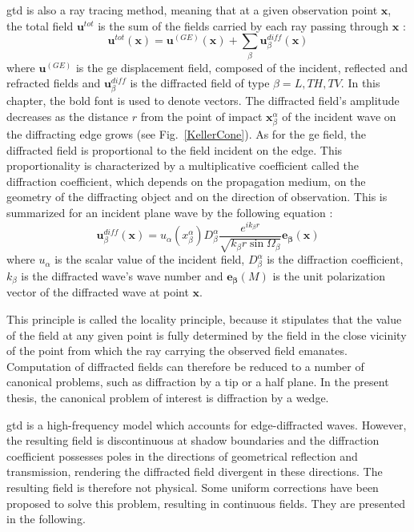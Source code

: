 \acrshort{gtd} is also a ray tracing method, meaning that at a given observation point $\mathbf{x}$, the total field $\mathbf{u}^{tot}$ is the sum of the fields carried by each ray passing through $\mathbf{x}$ :
\begin{equation}
    \mathbf{u}^{tot}(\mathbf{x})=\mathbf{u}^{(GE)}(\mathbf{x})+\sum_{\beta} \mathbf{u}^{diff}_{\beta}(\mathbf{x})
    \label{GTDtot}
\end{equation}
where $\mathbf{u}^{(GE)}$ is the \acrshort{ge} displacement field, composed of the incident, reflected and refracted fields and $\mathbf{u}^{diff}_{\beta}$ is the diffracted field of type $\beta=L,TH,TV$. In this chapter, the bold font is used to denote vectors. The diffracted field's amplitude decreases as the distance $r$ from the point of impact $\mathbf{x}_{\beta}^{\alpha}$ of the incident wave on the diffracting edge grows (see Fig.~\ref{KellerCone}). As for the \acrshort{ge} field, the diffracted field is proportional to the field incident on the edge. This proportionality is characterized by a multiplicative coefficient called the diffraction coefficient, which depends on the propagation medium, on the geometry of the diffracting object and on the direction of observation. This is summarized for an incident plane wave by the following equation :
\begin{equation}
    \mathbf{u}_{\beta}^{diff}(\mathbf{x})=u_{\alpha}(x_{\beta}^{\alpha})D_{\beta}^{\alpha}\dfrac{e^{ik_{\beta}r}}{\sqrt{k_{\beta}r\sin\Omega_{\beta}}}\mathbf{e_{\beta}}(\mathbf{x})
    \label{C1:GTDdiff}
\end{equation}
where $u_{\alpha}$ is the scalar value of the incident field, $D_{\beta}^{\alpha}$ is the diffraction coefficient, $k_{\beta}$ is the diffracted wave's wave number and $\mathbf{e_{\beta}}(M)$ is the unit polarization vector of the diffracted wave at point $\mathbf{x}$.

This principle is called the locality principle, because it stipulates that the value of the field at any given point is fully determined by the field in the close vicinity of the point from which the ray carrying the observed field emanates. Computation of diffracted fields can therefore be reduced to a number of canonical problems, such as diffraction by a tip or a half plane. In the present thesis, the canonical problem of interest is diffraction by a wedge.

\acrshort{gtd} is a high-frequency model which accounts for edge-diffracted waves. However, the resulting field is discontinuous at shadow boundaries and the diffraction coefficient possesses poles in the directions of geometrical reflection and transmission, rendering the diffracted field divergent in these directions. The resulting field is therefore not physical. Some uniform corrections have been proposed to solve this problem, resulting in continuous fields. They are presented in the following. 

